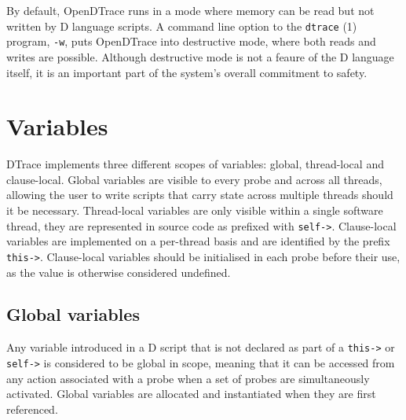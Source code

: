 By default, OpenDTrace runs in a mode where memory can be read but not
written by D language scripts.  A command line option to the \texttt{dtrace} (1)
program, \texttt{-w}, puts OpenDTrace into destructive mode, where both reads
and writes are possible.  Although destructive mode is not a feaure of
the D language itself, it is an important part of the system's overall
commitment to safety.




\section{Variables}
\label{sec:d-variables}
DTrace implements three different scopes of variables: global,
thread-local and clause-local. Global variables are visible to every
probe and across all threads, allowing the user to write scripts that
carry state across multiple threads should it be
necessary. Thread-local variables are only visible within a single
software thread, they are represented in source code as prefixed with
\texttt{self->}. Clause-local variables are implemented on a
per-thread basis and are identified by the prefix
\texttt{this->}. Clause-local variables should be initialised in each
probe before their use, as the value is otherwise considered
undefined.

\subsection{Global variables}
\label{subsec:global-variables}

Any variable introduced in a D script that is not declared as part of
a \verb|this->| or \verb|self->| is considered to be global in scope,
meaning that it can be accessed from any action associated with a
probe when a set of probes are simultaneously activated.  Global
variables are allocated and instantiated when they are first
referenced.

